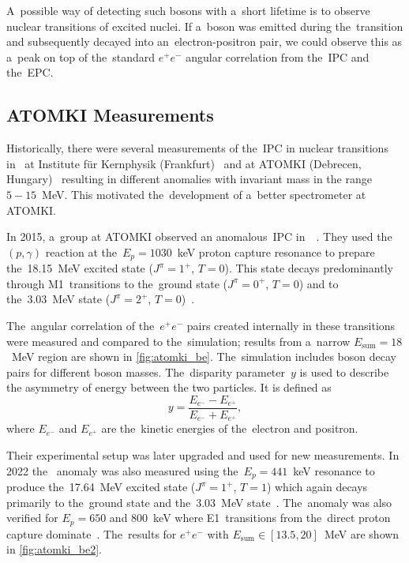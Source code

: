 		A~possible way of detecting such bosons with a~short lifetime is to observe nuclear transitions of excited nuclei. If a~boson was emitted during the~transition and subsequently decayed into an~electron\nobreakdash-positron pair, we could observe this as a~peak on top of the~standard $e^+e^-$ angular correlation from the~\acf{IPC} and the~\acf{EPC}.
	
		\subsection{ATOMKI Measurements}
			Historically, there were several measurements of the~\ac{IPC} in nuclear transitions in~ at Institute für Kernphysik (Frankfurt)~\cite{ikf1996,ikf1997,ikf2001} and at ATOMKI (Debrecen, Hungary)~\cite{atomki2008,atomki2012} resulting in different anomalies with invariant mass in the range $5-15$~MeV. This motivated the~development of a~better spectrometer at ATOMKI.
		
			In 2015, a~group at ATOMKI observed an anomalous~\ac{IPC} in~~\cite{atomki_be}. They used the~$(p,\gamma)$ reaction at the~$E_p = 1030$~keV proton capture resonance to prepare the~18.15~MeV excited state ($J^\pi = 1^{+}$, $T=0$). This state decays predominantly through M1~transitions to the~ground state ($J^\pi = 0^{+}$, $T=0$) and to the~3.03~MeV state ($J^\pi = 2^{+}$, $T=0$)~\cite{resonances}.
			
			The~angular correlation of the~$e^+ e^-$ pairs created internally in these transitions were measured and compared to the~simulation; results from a~narrow $E_\text{sum}=18$~MeV region are shown in \cref{fig:atomki_be}. The~simulation includes boson decay pairs for different boson masses. The~disparity parameter~$y$ is used to describe the asymmetry of energy between the two particles. It is defined as
				\begin{equation}
					\label{eq:dispar}
					y = \frac{E_{e^-}-E_{e^+}}{E_{e^-}+E_{e^+}},
				\end{equation}
			where $E_{e^-}$ and $E_{e^+}$ are the~kinetic energies of the~electron and positron.
			
			Their experimental setup was later upgraded and used for new measurements. In 2022 the~ anomaly was also measured using the~$E_p = 441$~keV resonance to produce the~17.64~MeV excited state ($J^\pi = 1^{+}$, $T=1$) which again decays primarily to the~ground state and the~3.03~MeV state~\cite{resonances}. The~anomaly was also verified for $E_p = 650$ and 800~keV where E1~transitions from the~direct proton capture dominate~\cite{atomki_be2}. The~results for $e^+e^-$ with ${E_\text{sum}\in[13.5,20]}$~MeV are shown in \cref{fig:atomki_be2}.
			
